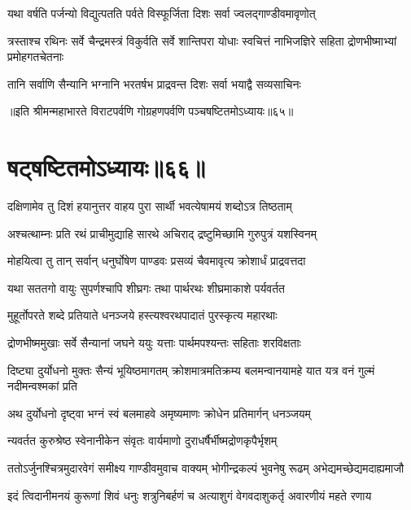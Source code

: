 \twolineshloka
{यथा वर्षति पर्जन्यो विद्युत्पतति पर्वते}
{विस्फूर्जिता दिशः सर्वा ज्वलद्गाण्डीवमावृणोत्}


\threelineshloka
{त्रस्ताश्च रथिनः सर्वे चैन्द्रमस्त्रं विकुर्वति}
{सर्वे शान्तिपरा योधाः स्वचित्तं नाभिजज्ञिरे}
{सहिता द्रोणभीष्माभ्यां प्रमोहगतचेतनाः}


\twolineshloka
{तानि सर्वाणि सैन्यानि भग्नानि भरतर्षभ}
{प्राद्रवन्त दिशः सर्वा भयाद्वै सव्यसाचिनः}

॥इति श्रीमन्महाभारते विराटपर्वणि गोग्रहणपर्वणि पञ्चषष्टितमोऽध्यायः॥६५॥

\chapter{षट्षष्टितमोऽध्यायः॥६६॥}

\twolineshloka
{दक्षिणामेव तु दिशं हयानुत्तर वाहय}
{पुरा सार्थी भवत्येषामयं शब्दोऽत्र तिष्ठताम्}


\twolineshloka
{अश्चत्थाम्नः प्रति रथं प्राचीमुद्याहि सारथे}
{अचिराद् द्रष्टुमिच्छामि गुरुपुत्रं यशस्विनम्}



\twolineshloka
{मोहयित्वा तु तान् सर्वान् धनुर्घोषेण पाण्डवः}
{प्रसव्यं चैवमावृत्य क्रोशार्धं प्राद्रवत्तदा}


\twolineshloka
{यथा सततगो वायुः सुपर्णश्चापि शीघ्रगः}
{तथा पार्थरथः शीघ्रमाकाशे पर्यवर्तत}


\twolineshloka
{मुहूर्तोपरते शब्दे प्रतियाते धनञ्जये}
{हस्त्यश्वरथपादातं पुरस्कृत्य महारथाः}


\twolineshloka
{द्रोणभीष्ममुखाः सर्वे सैन्यानां जघने ययुः}
{यत्ताः पार्थमपश्यन्तः सहिताः शरविक्षताः}




\threelineshloka
{दिष्ट्या दुर्योधनो मुक्तः सैन्यं भूयिष्ठमागतम्}
{क्रोशमात्रमतिक्रम्य बलमन्वानयामहे}
{यात यत्र वनं गुल्मं नदीमन्वश्मकां प्रति}



\twolineshloka
{अथ दुर्योधनो दृष्ट्वा भग्नं स्वं बलमाहवे}
{अमृष्यमाणः क्रोधेन प्रतिमार्गन् धनञ्जयम्}


\twolineshloka
{न्यवर्तत कुरुश्रेष्ठ स्वेनानीकेन संवृतः}
{वार्यमाणो दुराधर्षैर्भीष्मद्रोणकृपैर्भृशम्}


\fourlineindentedshloka
{ततोऽर्जुनश्चित्रमुदारवेगं}
{समीक्ष्य गाण्डीवमुवाच वाक्यम्}
{भोगीन्द्रकल्पं भुवनेषु रूढम्}
{अभेद्यमच्छेद्यमदाह्यमाजौ}


\fourlineindentedshloka
{इदं त्विदानीमनयं कुरूणां}
{शिवं धनुः शत्रुनिबर्हणं च}
{अत्याशुगं वेगवदाशुकर्तृ}
{अवारणीयं महते रणाय}


